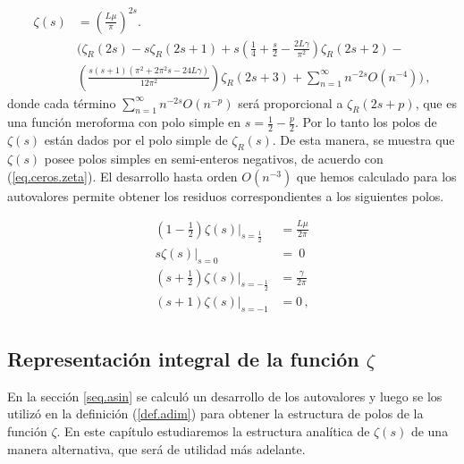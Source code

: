 \begin{equation}
\begin{aligned}
    \zeta  (s) &= \left( \frac{L \mu }{\pi} \right) ^{2s} . \\[5pt]
	& \Bigg(
		\zeta _R ( 2 s ) -
		s \zeta _R ( 2s+1 ) +
		 s \left( \frac{1}{4} + \frac{s}{2} - \frac{2 L  \gamma}{\pi ^2} \right) \zeta _R (2s +2 ) - \\[5pt]
		 &  \left(  
					\frac{s(s+1) ( \pi ^2 + 2 \pi ^2 s - 24 L \gamma)}{12 \pi ^2 }
		 			\right) \zeta _R (2s+3)
		+ \sum _{n=1} ^{\infty} n ^{-2s} O ( n ^{-4})
		\Bigg)
		\, ,
\end{aligned}
\end{equation}
donde cada término $\sum _{n=1} ^{\infty} n ^{-2s} O ( n ^{-p})$ será proporcional a $\zeta _R (2s+p)$, que es una función meroforma con polo simple en $s = \frac{1}{2} - \frac{p}{2}$.
Por lo tanto los polos de $\zeta (s)$ están dados por el polo simple de $\zeta _R (s)$. De esta manera, se muestra que $\zeta (s)$ posee polos simples en semi-enteros negativos, de acuerdo con (\ref{eq.ceros.zeta}). El desarrollo hasta orden $O(n^{-3})$ que hemos calculado para los autovalores permite obtener los residuos correspondientes a los siguientes polos.


\begin{equation}
\begin{aligned}
\left(1- \frac{1}{2} \right) \zeta  (s)| _{s=\frac{1}{2}} &= 
\frac{L \mu }{2 \pi } \\[5pt]
s \zeta  (s) |_{s=0} &= \ 0 \\[5pt]
\left( s + \frac{1}{2} \right)\zeta  (s) | _{s=-\frac{1}{2}} &= \frac{\gamma}{2 \pi  } \\[5pt]
(s+1) \zeta (s) |_{s=-1} &=  0
\, ,
\\[5pt]
\end{aligned}
\label{eq.polos.asin}
\end{equation}



\subsection{Representación integral de la función $\zeta$}
{\label{sec.complejo}}

En la sección \ref{seq.asin} se calculó un desarrollo de los autovalores y luego se
los utilizó en la definición (\ref{def.adim}) para obtener
la estructura de polos de la función $\zeta$. En este capítulo estudiaremos la
estructura analítica de $\zeta (s)$ de una manera alternativa, que será de utilidad
más adelante.

